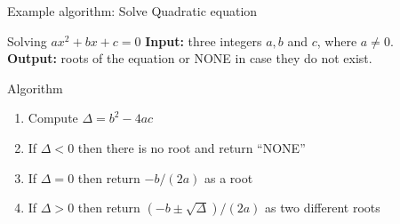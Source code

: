 \documentclass[aspectratio=169]{beamer}
\begin{document}
\begin{frame}{Example algorithm: Solve Quadratic equation}
  \begin{block}{Solving $ax^2+bx+c=0$}
        \textbf{Input:} three integers $a,b$ and $c$, where $a\not=0$.\\
        \textbf{Output:} roots of the equation or NONE in case they do not exist.
      \end{block}
      \begin{exampleblock}{Algorithm}
        \begin{enumerate}
          \item Compute $\Delta=b^2-4ac$
          \item If $\Delta<0$ then there is no root and return ``NONE''
          \item If $\Delta=0$ then return $-b/(2a)$ as a root
          \item If $\Delta>0$ then return $(-b\pm\sqrt{\Delta})/(2a)$ as two different roots
        \end{enumerate}
      \end{exampleblock}
\end{frame}
\end{document}
